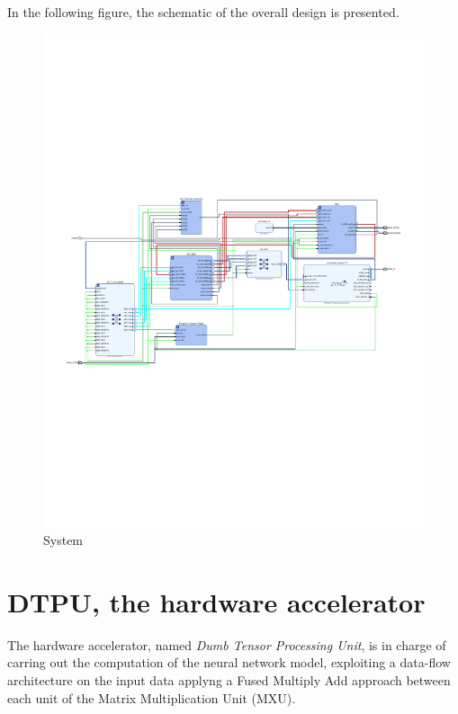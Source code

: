 \newpage
In the following figure, the schematic of the overall design is presented.
\begin{figure}[!htbp]
\centering
\captionsetup{justification=centering}
\includegraphics[scale=1,angle=90]{./figure/system_schematic.pdf}
\caption{System}
\label{fig:sys}
\end{figure}

\section{DTPU, the hardware accelerator}
The hardware accelerator, named \textit{ Dumb Tensor Processing Unit}, is in charge of carring out the computation of the neural network model, exploiting a data-flow architecture on the input data applyng a Fused Multiply Add approach between each unit of the Matrix Multiplication Unit (MXU).

